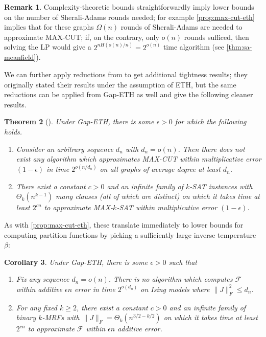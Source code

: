\documentclass[11pt, oneside, english]{article}
\newcommand{\F}{\mathcal{F}}
\newtheorem{theorem}{Theorem}[section]
\newtheorem{corollary}[theorem]{Corollary}
\theoremstyle{definition}
\newtheorem{remark}[theorem]{Remark}
\theoremstyle{plain}
\begin{document}
\begin{remark}
Complexity-theoretic bounds straightforwardly imply lower bounds on the number of Sherali-Adams rounds needed; for example \cref{prop:max-cut-eth} implies that for these graphs $\Omega(n)$ rounds of Sherali-Adams are needed to approximate MAX-CUT; if, on the contrary, only $o(n)$ rounds sufficed, then solving the LP would give a $2^{n H(o(n)/n)} = 2^{o(n)}$ time algorithm (see \cref{thm:sa-meanfield}).
\end{remark}
We can further apply reductions from \cite{fotakis2015sub} to get additional tightness results; they originally stated their results under the assumption of ETH, but the same reductions can be applied from Gap-ETH as well and give the following cleaner results. 
\begin{theorem}[\cite{fotakis2015sub}]\label{thm:fotakis}
Under Gap-ETH, there is some $\epsilon > 0$ for which the following holds.
\begin{enumerate}
\item Consider an arbitrary sequence $d_n$ with $d_n = o(n)$. Then there does not exist any algorithm which approximates MAX-CUT within multiplicative error $(1 - \epsilon)$ in time $2^{o(n/d_n)}$ on all graphs of average degree at least $d_n$.
\item There exist a constant $c>0$ and an infinite family of $k$-SAT instances with $\Theta_k(n^{k - 1})$ many clauses (all of which are distinct) on which it takes time at least $2^{cn}$ to approximate MAX-$k$-SAT within multiplicative error $(1 - \epsilon)$. 
\end{enumerate}
\end{theorem}
As with \cref{prop:max-cut-eth}, these translate immediately to
lower bounds for computing partition functions by picking a sufficiently
large inverse temperature $\beta$:
\begin{corollary}
\label{corollary:time/density-tradeoff}
Under Gap-ETH, there is some $\epsilon > 0$ such that
\begin{enumerate}
\item Fix any sequence $d_n = o(n)$. There is no algorithm which computes $\F$ within additive $\epsilon n$ error in time $2^{o(d_n)}$ on Ising models
where $\|J\|_F^2 \le d_n$.
\item For any fixed $k \ge 2$, there exist a constant $c>0$ and  an infinite family of binary $k$-MRFs with $\|J\|_F = \Theta_{k}(n^{3/2 - k/2})$ on which it takes time at least $2^{cn}$ to approximate $\F$ within $\epsilon n$ additive error. 
\end{enumerate}
\end{corollary}
\end{document}
